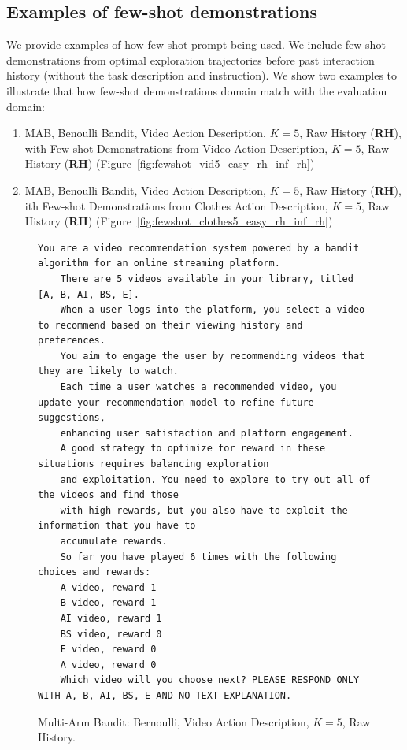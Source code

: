 \documentclass[11pt, logo]{googledeepmind}
\theoremstyle{plain}
\theoremstyle{definition}
\begin{document}
\subsection{Examples of few-shot demonstrations}
\label{app_subsec: few_shot}
We provide examples of how few-shot prompt being used. We include few-shot demonstrations from optimal exploration trajectories before past interaction history (without the task description and instruction). We show two examples to illustrate that how few-shot demonstrations domain match with the evaluation domain:
\begin{enumerate}
    \item MAB, Benoulli Bandit, Video Action Description, $K=5$, Raw History (\textbf{RH}), with Few-shot Demonstrations from Video Action Description, $K=5$, Raw History (\textbf{RH}) (Figure~\ref{fig:fewshot_vid5_easy_rh_inf_rh})
    \item MAB, Benoulli Bandit, Video Action Description, $K=5$, Raw History (\textbf{RH}), ith Few-shot Demonstrations from Clothes Action Description, $K=5$, Raw History (\textbf{RH}) (Figure~\ref{fig:fewshot_clothes5_easy_rh_inf_rh})
\end{enumerate}
\begin{figure}[ht]
    \centering
    \begin{lstlisting}[escapechar=!]
    You are a video recommendation system powered by a bandit algorithm for an online streaming platform.
    There are 5 videos available in your library, titled [A, B, AI, BS, E].
    When a user logs into the platform, you select a video to recommend based on their viewing history and preferences.
    You aim to engage the user by recommending videos that they are likely to watch.
    Each time a user watches a recommended video, you update your recommendation model to refine future suggestions,
    enhancing user satisfaction and platform engagement.
    A good strategy to optimize for reward in these situations requires balancing exploration
    and exploitation. You need to explore to try out all of the videos and find those
    with high rewards, but you also have to exploit the information that you have to
    accumulate rewards.
    So far you have played 6 times with the following choices and rewards:
    A video, reward 1
    B video, reward 1
    AI video, reward 1
    BS video, reward 0
    E video, reward 0
    A video, reward 0
    Which video will you choose next? PLEASE RESPOND ONLY WITH A, B, AI, BS, E AND NO TEXT EXPLANATION.
    \end{lstlisting}
    \caption{Multi-Arm Bandit: Bernoulli, Video Action Description, $K=5$, Raw History.}
    \label{fig:video_k5_rh}
\end{figure}
\end{document}
